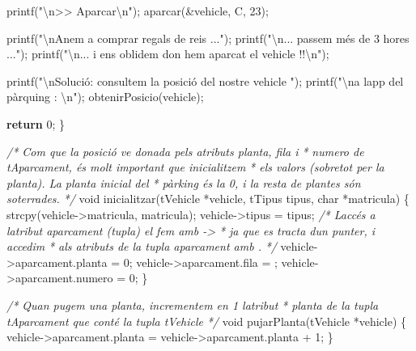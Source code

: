 \documentclass[]{book}
\newenvironment{Shaded}{\begin{snugshade}}{\end{snugshade}}
\newcommand{\CharTok}[1]{\textcolor[rgb]{0.31,0.60,0.02}{#1}}
\newcommand{\CommentTok}[1]{\textcolor[rgb]{0.56,0.35,0.01}{\textit{#1}}}
\newcommand{\ControlFlowTok}[1]{\textcolor[rgb]{0.13,0.29,0.53}{\textbf{#1}}}
\newcommand{\DataTypeTok}[1]{\textcolor[rgb]{0.13,0.29,0.53}{#1}}
\newcommand{\DecValTok}[1]{\textcolor[rgb]{0.00,0.00,0.81}{#1}}
\newcommand{\NormalTok}[1]{#1}
\newcommand{\SpecialCharTok}[1]{\textcolor[rgb]{0.00,0.00,0.00}{#1}}
\newcommand{\StringTok}[1]{\textcolor[rgb]{0.31,0.60,0.02}{#1}}
\begin{document}
\begin{Shaded}
\begin{Highlighting}[]
\NormalTok{    printf(}\StringTok{"}\SpecialCharTok{\textbackslash{}n}\StringTok{\textgreater{}\textgreater{} Aparcar}\SpecialCharTok{\textbackslash{}n}\StringTok{"}\NormalTok{);}
\NormalTok{    aparcar(\&vehicle, }\CharTok{\textquotesingle{}C\textquotesingle{}}\NormalTok{, }\DecValTok{23}\NormalTok{);}
    
\NormalTok{    printf(}\StringTok{"}\SpecialCharTok{\textbackslash{}n}\StringTok{Anem a comprar regals de reis ..."}\NormalTok{);}
\NormalTok{    printf(}\StringTok{"}\SpecialCharTok{\textbackslash{}n}\StringTok{... passem més de 3 hores ..."}\NormalTok{);}
\NormalTok{    printf(}\StringTok{"}\SpecialCharTok{\textbackslash{}n}\StringTok{... i ens oblidem d\textquotesingle{}on hem aparcat el vehicle !!}\SpecialCharTok{\textbackslash{}n}\StringTok{"}\NormalTok{);}
    
\NormalTok{    printf(}\StringTok{"}\SpecialCharTok{\textbackslash{}n}\StringTok{Solució: consultem la posició del nostre vehicle "}\NormalTok{);}
\NormalTok{    printf(}\StringTok{"}\SpecialCharTok{\textbackslash{}n}\StringTok{a l\textquotesingle{}app del pàrquing : }\SpecialCharTok{\textbackslash{}n}\StringTok{"}\NormalTok{);}
\NormalTok{    obtenirPosicio(vehicle);}
    
    \ControlFlowTok{return} \DecValTok{0}\NormalTok{;}
\NormalTok{\}}

\CommentTok{/* Com que la posició ve donada pels atributs planta, fila i}
\CommentTok{ * numero de tAparcament, és molt important que inicialitzem}
\CommentTok{ * els valors (sobretot per la planta). La planta inicial del}
\CommentTok{ * pàrking és la 0, i la resta de plantes són soterrades.}
\CommentTok{ */}
\DataTypeTok{void}\NormalTok{ inicialitzar(tVehicle *vehicle, tTipus tipus, }\DataTypeTok{char}\NormalTok{ *matricula) \{}
\NormalTok{    strcpy(vehicle{-}\textgreater{}matricula, matricula);}
\NormalTok{    vehicle{-}\textgreater{}tipus = tipus;}
    \CommentTok{/* L\textquotesingle{}accés a l\textquotesingle{}atribut aparcament (tupla) el fem amb {-}\textgreater{}}
\CommentTok{     * ja que es tracta d\textquotesingle{}un punter, i accedim}
\CommentTok{     * als atributs de la tupla aparcament amb . }
\CommentTok{     */}
\NormalTok{    vehicle{-}\textgreater{}aparcament.planta = }\DecValTok{0}\NormalTok{;}
\NormalTok{    vehicle{-}\textgreater{}aparcament.fila = }\CharTok{\textquotesingle{}{-}\textquotesingle{}}\NormalTok{;}
\NormalTok{    vehicle{-}\textgreater{}aparcament.numero = }\DecValTok{0}\NormalTok{;}
\NormalTok{\}}

\CommentTok{/* Quan pugem una planta, incrementem en 1 l\textquotesingle{}atribut}
\CommentTok{ * planta de la tupla tAparcament que conté la tupla tVehicle }
\CommentTok{ */}
\DataTypeTok{void}\NormalTok{ pujarPlanta(tVehicle *vehicle) \{}
\NormalTok{    vehicle{-}\textgreater{}aparcament.planta = vehicle{-}\textgreater{}aparcament.planta + }\DecValTok{1}\NormalTok{;}
\NormalTok{\}}


\end{Highlighting}
\end{Shaded}
\end{document}
